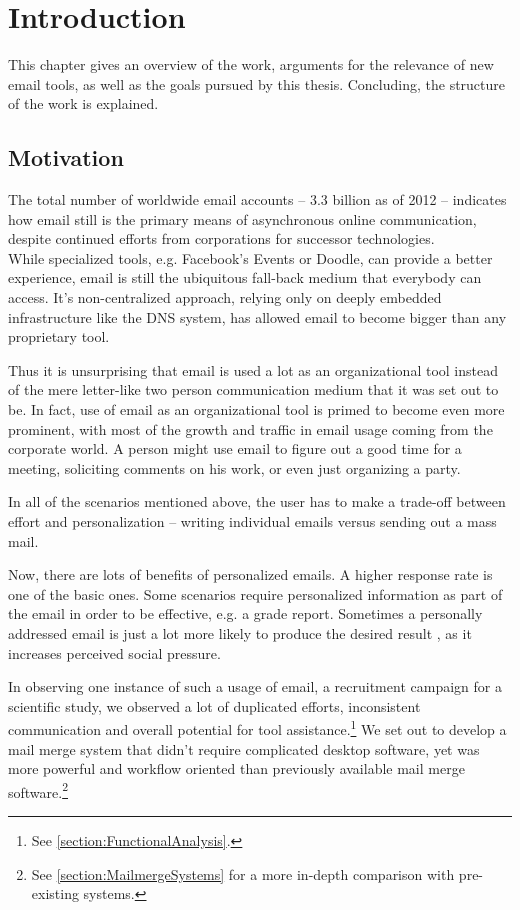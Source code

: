 \chapter{Introduction}
\label{chapter:Introduction}

This chapter gives an overview of the work, arguments for the relevance of new email tools, as well as the goals pursued by this thesis. Concluding, the structure of the work is explained.

\section{Motivation}

The total number of worldwide email accounts -- 3.3 billion as of 2012 \citep{emailreport} -- indicates how email still is the primary means of asynchronous online communication, despite continued efforts from corporations for successor technologies. \\
While specialized tools, e.g. Facebook's Events or Doodle, can provide a better experience, email is still the ubiquitous fall-back medium that everybody can access. It's non-centralized approach, relying only on deeply embedded infrastructure like the DNS system, has allowed email to become bigger than any proprietary tool.

Thus it is unsurprising that email is used a lot as an organizational tool instead of the mere letter-like two person communication medium that it was set out to be. In fact, use of email as an organizational tool is primed to become even more prominent, with most of the growth and traffic in email usage coming from the corporate world. \citep[p. 3]{emailreport} A person might use email to figure out a good time for a meeting, soliciting comments on his work, or even just organizing a party.

In all of the scenarios mentioned above, the user has to make a trade-off between effort and personalization -- writing individual emails versus sending out a mass mail.

Now, there are lots of benefits of personalized emails. A higher response rate is one of the basic ones. Some scenarios require personalized information as part of the email in order to be effective, e.g. a grade report. Sometimes a personally addressed email is just a lot more likely to produce the desired result \citep[p. 1375, 1380]{Joinson2007}, as it increases perceived social pressure.

In observing one instance of such a usage of email, a recruitment campaign for a scientific study, we observed a lot of duplicated efforts, inconsistent communication and overall potential for tool assistance.\footnote{See \autoref{section:FunctionalAnalysis}.} We set out to develop a mail merge system that didn't require complicated desktop software, yet was more powerful and workflow oriented than previously available mail merge software.\footnote{See \autoref{section:MailmergeSystems} for a more in-depth comparison with pre-existing systems.}

